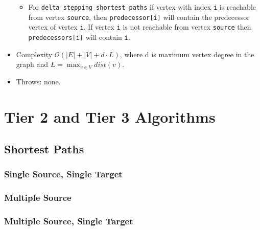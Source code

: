 \begin{itemize}
\begin{itemize}
\item[]
For \lstinline{delta_stepping_shortest_paths} if vertex with index \lstinline{i} is reachable
from vertex \lstinline{source}, then \lstinline{predecessor[i]} will contain the
predecessor vertex of vertex \lstinline{i}.  If vertex \lstinline{i} is not reachable
from vertex \lstinline{source} then \lstinline{predecessors[i]} will contain
\lstinline{i}.
\end{itemize}
%
\item[] Complexity $\mathcal{O}(|E| + |V| + d\cdot L)$, where d is maximum vertex degree in the graph and $L = \max_{v\in V} dist(v)$.
\item[] Throws: none. 
\end{itemize}






\section{Tier 2 and Tier 3 Algorithms}


\subsection{Shortest Paths}
\subsubsection{Single Source, Single Target}
\subsubsection{Multiple Source}
\subsubsection{Multiple Source, Single Target}


